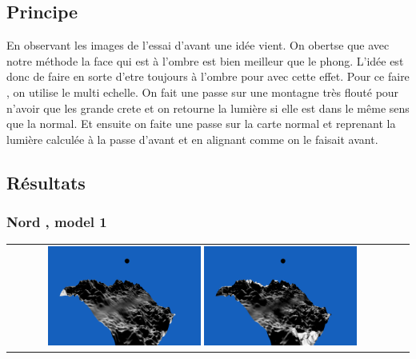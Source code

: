 \documentclass[a4paper]{article}
\begin{document}
\subsection{Principe}
En observant les images de l'essai d'avant une idée vient.
On obertse que avec notre méthode la face qui est à l'ombre est bien meilleur que le phong. L'idée est donc de faire en sorte d'etre toujours à l'ombre pour avec cette effet.
Pour ce faire , on utilise le multi echelle. On fait une passe sur une montagne très flouté pour n'avoir que les grande crete et on retourne la lumière si elle est dans le même sens que la normal. 
Et ensuite on faite une passe sur la carte normal et reprenant la lumière calculée à la passe d'avant et en alignant comme on le faisait avant. 
\subsection{Résultats}

\subsubsection{Nord , model 1}
\begin{tabular}{cc}
\includegraphics[width=0.4\textwidth]{Images/Essais/Essai_11_phong_North_0.png}
\includegraphics[width=0.4\textwidth]{Images/Essais/Essai_11_slint_North_0.png}
\end{tabular}
\end{document}
